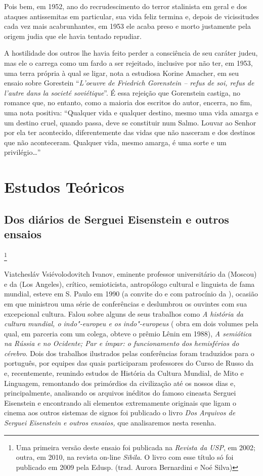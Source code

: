 Pois bem, em 1952, ano do recrudescimento do terror stalinista em geral
e dos ataques antissemitas em particular, sua vida feliz termina e,
depois de vicissitudes cada vez mais acabrunhantes, em 1953 ele acaba
preso e morto justamente pela origem judia que ele havia tentado
repudiar.

A hostilidade dos outros lhe havia feito perder a consciência de seu
caráter judeu, mas ele o carrega como um fardo a ser rejeitado,
inclusive por não ter, em 1953, uma terra própria à qual se ligar, nota
a estudiosa Korine Amacher, em seu ensaio sobre Gorestein ``\emph{L'oeuvre de
Friedrich Gorenstein -- refus de soi, refus de l'autre dans la societé
soviétique}''. É essa rejeição que Gorenstein castiga, no romance que, no entanto, como a maioria dos escritos do autor, encerra,
no fim, uma nota positiva: ``Qualquer vida e qualquer destino, mesmo uma
vida amarga e um destino cruel, quando passa, deve se constituir num
Salmo. Louvar ao Senhor por ela ter acontecido, diferentemente das vidas
que não nasceram e dos destinos que não aconteceram. Qualquer vida,
mesmo amarga, é uma sorte e um privilégio\ldots{}''

\part{Estudos Teóricos}

\chapter{Dos diários de Serguei Eisenstein e outros ensaios}\footnote{Uma
  primeira versão deste ensaio foi publicada na \emph{Revista da USP},
  em 2002; outra, em 2010, na revista on-line \emph{Sibila}. O livro com
  esse título só foi publicado em 2009 pela Edusp. (trad. Aurora
  Bernardini e Noé Silva)}

Viatchesláv Vsiévolodovitch Ivanov, eminente professor universitário da
 (Moscou) e da  (Los Angeles), crítico, semioticista,
antropólogo cultural e linguista de fama mundial, esteve em S. Paulo em
1990 (a convite do  e com patrocínio da ), ocasião em que
ministrou uma série de conferências e deslumbrou os ouvintes com sua
excepcional cultura. Falou sobre alguns de seus trabalhos como \emph{A
história da cultura mundial, o indo"-europeu e os indo"-europeus} (
obra em dois volumes pela qual, em parceria com um colega, obteve o
prêmio Lênin em 1988), \emph{A semiótica na Rússia e no Ocidente; Par e
ímpar: o funcionamento dos hemisférios do cérebro}. Dois dos trabalhos
ilustrados pelas conferências foram traduzidos para o português, por
equipes das quais participaram professores do Curso de Russo da  e, recentemente, reunindo estudos de
História da Cultura Mundial, de Mito e Linguagem, remontando dos
primórdios da civilização até os nossos dias e, principalmente,
analisando os arquivos inéditos do famoso cineasta Serguei Eisenstein e
encontrando ali elementos extremamente originais que ligam o cinema aos
outros sistemas de signos foi publicado o livro \emph{Dos Arquivos de
Serguei Eisenstein e outros ensaios,} que analisaremos nesta resenha.

